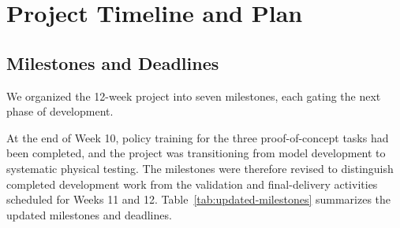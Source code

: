 \documentclass[12pt, letterpaper]{article}
\newcommand{\drone}[1]{{\color{gray}#1}}
\begin{document}
\endgroup




\section{Project Timeline and Plan}

\subsection{Milestones and Deadlines}

\drone{We organized the 12-week project into seven milestones, each gating the
next phase of development.}

At the end of Week 10, policy training for the three proof-of-concept tasks had
been completed, and the project was transitioning from model development to
systematic physical testing. The milestones were therefore revised to
distinguish completed development work from the validation and final-delivery
activities scheduled for Weeks 11 and 12. Table~\ref{tab:updated-milestones}
summarizes the updated milestones and deadlines.
\end{document}
